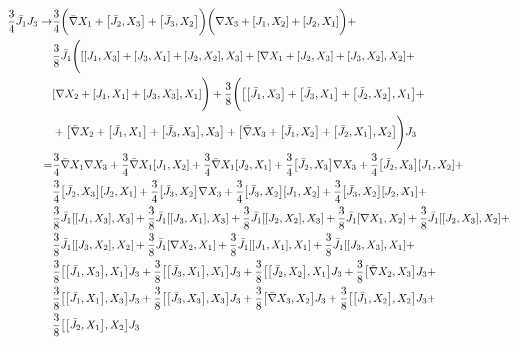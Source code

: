 \documentclass[12pt]{article}
\numberwithin{equation}{section}
\begin{document}
{\begin{align}
\frac{3}{4} \bar{J}_1 J_3 \to &\frac{3}{4} \biggr(\bar{\nabla} X_1 + \comm{\bar{J}_2}{X_3} + \comm{\bar{J}_3}{X_2}\biggr)\biggr(\nabla X_3  + \comm{J_1}{X_2} + \comm{J_2}{X_1}\biggr) + \nonumber \\
			      &\frac{3}{8} \bar{J}_1 \Biggr(\comm{\comm{J_1}{X_3} + \comm{J_3}{X_1} + \comm{J_2}{X_2}}{X_3} + \comm{\nabla X_1 + \comm{J_2}{X_3} + \comm{J_3}{X_2}}{X_2} + \\& \comm{\nabla X_2 +\comm{J_1}{X_1} + \comm{J_3}{X_3}}{X_1}\Biggr)
			      + \frac{3}{8}  \Biggr(\comm{\comm{\bar{J}_1}{X_3} + \comm{\bar{J}_3}{X_1} + \comm{\bar{J}_2}{X_2}}{X_1} + \nonumber \\
			      & + \comm{\bar{\nabla} X_2 +\comm{\bar{J}_1}{X_1} + \comm{\bar{J}_3}{X_3}}{X_3} + \comm{\bar{\nabla} X_3  + \comm{\bar{J}_1}{X_2} + \comm{\bar{J}_2}{X_1}}{X_2}\Biggr) J_3 \nonumber \\
=& \frac{3}{4} \bar{\nabla} X_1 \nabla X_3 + \frac{3}{4} \bar{\nabla} X_1 \comm{J_1}{X_2} + \frac{3}{4} \bar{\nabla} X_1 \comm{J_2}{X_1} + \frac{3}{4} \comm{\bar{J}_2}{X_3} \nabla X_3 + \frac{3}{4} \comm{\bar{J}_2}{X_3} \comm{J_1}{X_2} + \nonumber \\
 &\frac{3}{4} \comm{\bar{J}_2}{X_3}\comm{J_2}{X_1} +  \frac{3}{4} \comm{\bar{J}_3}{X_2} \nabla X_3 +  \frac{3}{4} \comm{\bar{J}_3}{X_2} \comm{J_1}{X_2} +  \frac{3}{4} \comm{\bar{J}_3}{X_2}\comm{J_2}{X_1} + \nonumber \\
 & \frac{3}{8} \bar{J}_1 \comm{\comm{J_1}{X_3}}{X_3} + \frac{3}{8} \bar{J}_1 \comm{\comm{J_3}{X_1}}{X_3} + \frac{3}{8} \bar{J}_1 \comm{\comm{J_2}{X_2}}{X_3} + \frac{3}{8} \bar{J}_1 \comm{\nabla X_1}{X_2} +  \frac{3}{8} \bar{J}_1 \comm{\comm{J_2}{X_3}}{X_2} + \nonumber \\&\frac{3}{8} \bar{J}_1 \comm{\comm{J_3}{X_2}}{X_2} + \frac{3}{8} \bar{J}_1 \comm{\nabla X_2}{X_1} + \frac{3}{8} \bar{J}_1 \comm{\comm{J_1}{X_1}}{X_1} + \frac{3}{8} \bar{J}_1 \comm{\comm{J_3}{X_3}}{X_1} + \nonumber \\
 &\frac{3}{8}\comm{\comm{\bar{J_1}}{X_3}}{X_1}J_3 +  \frac{3}{8}\comm{\comm{\bar{J_3}}{X_1}}{X_1} J_3 + \frac{3}{8}\comm{\comm{\bar{J_2}}{X_2}}{X_1} J_3 + \frac{3}{8}\comm{\bar{\nabla} X_2}{X_3}J_3 + \nonumber \\& \frac{3}{8}\comm{\comm{\bar{J_1}}{X_1}}{X_3} J_3 + \frac{3}{8}\comm{\comm{\bar
 {J_3}}{X_3}}{X_3} J_3 + \frac{3}{8}\comm{\bar{\nabla}X_3}{X_2}J_3 + \frac{3}{8}\comm{\comm{\bar{J}_1}{X_2}}{X_2} J_3 +\nonumber \\
 &\frac{3}{8} \comm{\comm{\bar{J}_2}{X_1}}{X_2}J_3
\end{align}
}
\end{document}
